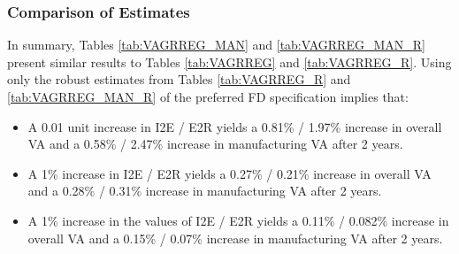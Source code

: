 \documentclass[a4paper]{article}
\begin{document}
\subsubsection{Comparison of Estimates}
In summary, Tables \ref{tab:VAGRREG_MAN} and \ref{tab:VAGRREG_MAN_R} present similar results to Tables \ref{tab:VAGRREG} and \ref{tab:VAGRREG_R}. Using only the robust estimates from Tables \ref{tab:VAGRREG_R} and \ref{tab:VAGRREG_MAN_R} of the preferred FD specification implies that:
\begin{itemize}
\item A 0.01 unit increase in I2E / E2R yields a 0.81\% / 1.97\% increase in overall VA and a 0.58\% / 2.47\% increase in manufacturing VA after 2 years.
\item A 1\% increase in I2E / E2R yields a 0.27\% / 0.21\% increase in overall VA and a 0.28\% / 0.31\% increase in manufacturing VA after 2 years.
\item A 1\% increase in the values of I2E / E2R yields a 0.11\% / 0.082\% increase in overall VA and a 0.15\% / 0.07\% increase in manufacturing VA after 2 years.
\end{itemize}

\end{document}
